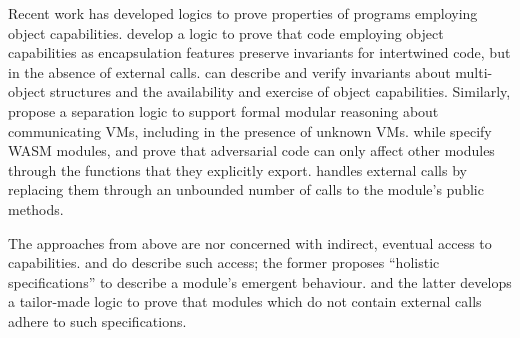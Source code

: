 Recent work has developed logics to prove properties of programs employing object capabilities.
\citet{ddd} develop a logic to prove that   code employing object
capabilities as encapsulation features preserve invariants for
intertwined code, but in the absence of external calls. 
  \citet{dd}  can describe and verify invariants
about multi-object structures and the availability and exercise of object capabilities.  %
 Similarly,
{\citet{vmsl-pldi2023} propose a separation logic to support formal modular reasoning about communicating VMs, including in the presence of unknown VMs.
while \cite{irisWasm23} specify WASM modules, %
and prove that adversarial code  can only affect other modules through the functions} that they explicitly export. 
\citet{CassezFQ24}  handles external calls by replacing them through an unbounded number of calls to the module's public methods.
 
 The approaches from above %
 are nor concerned with indirect, eventual access to capabilities.
\citet{FASE} and \citet{OOPSLA22} do describe such access; %
  the former proposes  ``holistic specifications'' to describe a module's emergent behaviour. 
and the latter develops 
a tailor-made logic to prove that modules which do not contain external calls adhere to such specifications.

